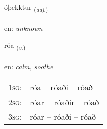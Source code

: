 \documentclass[frontgrid, backgrid]{flacards}\usepackage[]{graphicx}\usepackage[]{xcolor}
\begin{document}
\renewcommand{\flhead}{\vskip5pt \fboxsep=0pt {\small\bfseries\footnotesize Lýsingarorð | Adjective}}
\renewcommand{\fcfoot}{\vskip5pt \fboxsep=0pt \hspace{2pt}{\small\bfseries\footnotesize 3K}}

\renewcommand{\blhead}{\vskip5pt {\small\bfseries\footnotesize Lýsingarorð | Adjective }}
\renewcommand{\bcfoot}{\vskip5pt \hspace{2pt}{\small\bfseries\footnotesize 3K}}


{óþekktur \small{\textsubscript{(\textit{adj.})}} \\[1ex] %
\textphonetic{[ouːθɛxtʏr]} \\
en: \emph{unknown} \\  [2ex]
\renewcommand*{\arraystretch}{0.8}
}

\renewcommand{\flhead}{\vskip5pt \fboxsep=0pt {\small\bfseries\footnotesize Sagnorð | Verb}}
\renewcommand{\fcfoot}{\vskip5pt \fboxsep=0pt \hspace{2pt}{\small\bfseries\footnotesize 3K}}

\renewcommand{\blhead}{\vskip5pt {\small\bfseries\footnotesize Sagnorð | Verb }}
\renewcommand{\bcfoot}{\vskip5pt \hspace{2pt}{\small\bfseries\footnotesize 3K}}


{róa \small{\textsubscript{(\textit{v.})}} \\[1ex] %
\textphonetic{[rouːa]} \\
en: \emph{calm, soothe} \\  [2ex]
\renewcommand*{\arraystretch}{0.8}
\begin{tabular}{p{1cm}l}
\textsc{1sg}: & róa -- róaði -- róað \\ 
\textsc{2sg}: & róar -- róaðir -- róað \\ 
\textsc{3sg}: & róar -- róaði -- róað \\ 
\end{tabular}
}
\end{document}
